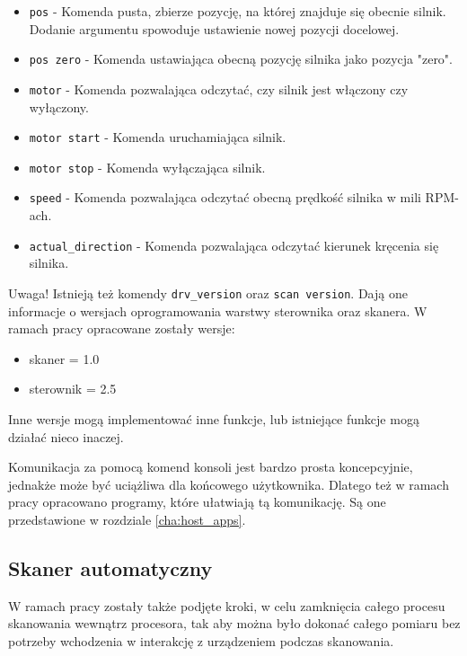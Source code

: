 \begin{itemize}
\begin{itemize}
        \item \texttt{pos} - Komenda pusta, zbierze pozycję, na której znajduje się obecnie silnik. Dodanie argumentu spowoduje ustawienie nowej pozycji docelowej.

        \item \texttt{pos zero} - Komenda ustawiająca obecną pozycję silnika jako pozycja "zero".

        \item \texttt{motor} - Komenda pozwalająca odczytać, czy silnik jest włączony czy wyłączony.

        \item \texttt{motor start} - Komenda uruchamiająca silnik.

        \item \texttt{motor stop} - Komenda wyłączająca silnik.

        \item \texttt{speed} - Komenda pozwalająca odczytać obecną prędkość silnika w mili RPM-ach.

        \item \texttt{actual\_direction} - Komenda pozwalająca odczytać kierunek kręcenia się silnika.
    \end{itemize}
\end{itemize}

Uwaga! Istnieją też komendy \texttt{drv\_version} oraz \texttt{scan version}. Dają one informacje o wersjach oprogramowania warstwy sterownika oraz skanera. W ramach pracy opracowane zostały wersje:
\vspace{-\topsep}
\begin{itemize}
    \item skaner = 1.0
    \item sterownik = 2.5
\end{itemize}
\vspace{-\topsep}
Inne wersje mogą implementować inne funkcje, lub istniejące funkcje mogą działać nieco inaczej.

Komunikacja za pomocą komend konsoli jest bardzo prosta koncepcyjnie, jednakże może być uciążliwa dla końcowego użytkownika. Dlatego też w ramach pracy opracowano programy, które ułatwiają tą komunikację. Są one przedstawione w rozdziale \ref{cha:host_apps}.

\subsection{Skaner automatyczny}
\label{cha:auto_scanner}
W ramach pracy zostały także podjęte kroki, w celu zamknięcia całego procesu skanowania wewnątrz procesora, tak aby można było dokonać całego pomiaru bez potrzeby wchodzenia w interakcję z urządzeniem podczas skanowania.


